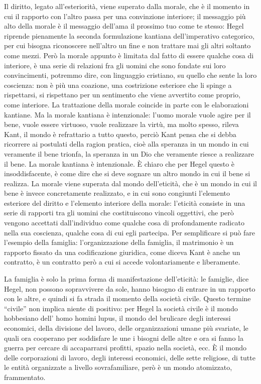 \documentclass[a4paper,12pt,oneside,openany]{book}%
\begin{document}
Il diritto, legato all’esteriorità, viene superato dalla morale, che è il momento in cui il rapporto con l’altro passa per una convinzione interiore; il messaggio più alto della morale è il messaggio dell’ama il prossimo tuo come te stesso: Hegel riprende pienamente la seconda formulazione kantiana dell’imperativo categorico, per cui bisogna riconoscere nell’altro un fine e non trattare mai gli altri soltanto come mezzi. Però la morale appunto è limitata dal fatto di essere qualche cosa di interiore, è una serie di relazioni fra gli uomini che sono fondate sui loro convincimenti, potremmo dire, con linguaggio cristiano, su quello che sente la loro coscienza: non è più una coazione, una costrizione esteriore che li spinge a rispettarsi, si rispettano per un sentimento che viene avvertito come proprio, come interiore. La trattazione della morale coincide in parte con le elaborazioni kantiane. Ma la morale kantiana è intenzionale: l’uomo morale vuole agire per il bene, vuole essere virtuoso, vuole realizzare la virtù, ma molto spesso, rileva Kant, il mondo è refrattario a tutto questo, perciò Kant pensa che si debba ricorrere ai postulati della ragion pratica, cioè alla speranza in un mondo in cui veramente il bene trionfa, la speranza in un Dio che veramente riesce a realizzare il bene. La morale kantiana è intenzionale. È chiaro che per Hegel questo è insoddisfacente, è come dire che si deve sognare un altro mondo in cui il bene si realizza. La morale viene superata dal mondo dell’eticità, che è un mondo in cui il bene è invece concretamente realizzato, e in cui sono congiunti l’elemento esteriore del diritto e l’elemento interiore della morale: l’eticità consiste in una serie di rapporti tra gli uomini che costituiscono vincoli oggettivi, che però vengono accettati dall’individuo come qualche cosa di profondamente radicato nella sua coscienza, qualche cosa di cui egli partecipa. Per semplificare si può fare l’esempio della famiglia: l’organizzazione della famiglia, il matrimonio è un rapporto fissato da una codificazione giuridica, come diceva Kant è anche un contratto, è un contratto però a cui si accede volontariamente e liberamente.

La famiglia è solo la prima forma di manifestazione dell’eticità: le famiglie, dice Hegel, non possono sopravvivere da sole, hanno bisogno di entrare in un rapporto con le altre, e quindi si fa strada il momento della società civile. Questo termine “civile” non implica niente di positivo: per Hegel la società civile è il mondo hobbesiano dell’ homo homini lupus, il mondo del brulicare degli interessi economici, della divisione del lavoro, delle organizzazioni umane più svariate, le quali ora cooperano per soddisfare le une i bisogni delle altre e ora si fanno la guerra per cercare di accaparrarsi profitti, spazio nella società, ecc. È il mondo delle corporazioni di lavoro, degli interessi economici, delle sette religiose, di tutte le entità organizzate a livello sovrafamiliare, però è un mondo atomizzato, frammentato.
\end{document}
